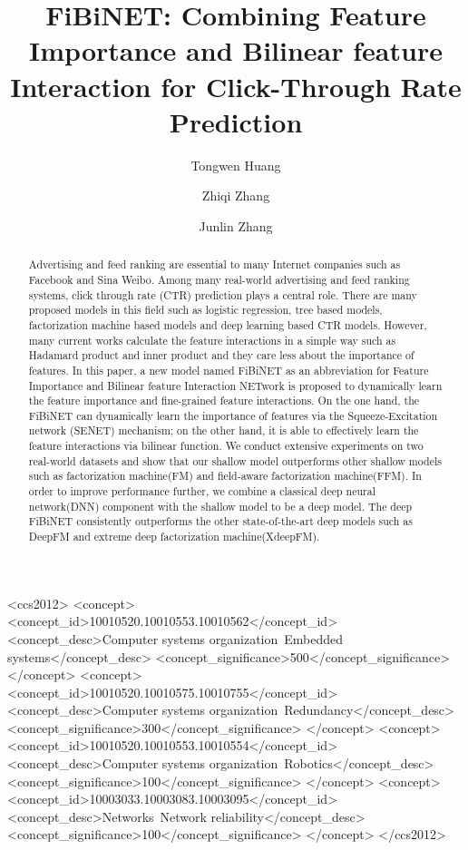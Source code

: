 \documentclass[sigconf]{acmart}
\begin{document}
\title[FiBiNET]{FiBiNET: Combining Feature Importance and Bilinear feature Interaction for Click-Through Rate Prediction}


\author{Tongwen Huang}

\author{Zhiqi Zhang}

\author{Junlin Zhang}
 

\begin{abstract}
Advertising and feed ranking are essential to many Internet companies such as Facebook and Sina Weibo. Among many real-world advertising and feed ranking systems, click through rate (CTR) prediction plays a central role. There are many proposed models in this field such as logistic regression, tree based models, factorization machine based models and deep learning based CTR models. However, many current works calculate the feature interactions in a simple way such as Hadamard product and inner product and they care less about the importance of features. In this paper, a new model named FiBiNET as an abbreviation for Feature Importance and Bilinear feature Interaction NETwork is proposed to dynamically learn the feature importance and fine-grained feature interactions. On the one hand, the FiBiNET can dynamically learn the importance of features via the Squeeze-Excitation network (SENET) mechanism; on the other hand, it is able to effectively learn the feature interactions via bilinear function. We conduct extensive experiments on two real-world datasets and show that our shallow model outperforms other shallow models such as factorization machine(FM) and field-aware factorization machine(FFM). In order to improve performance further, we combine a classical deep neural network(DNN) component with the
shallow model to be a deep model. The deep FiBiNET consistently outperforms the other state-of-the-art deep models such as DeepFM and extreme deep factorization machine(XdeepFM).
\end{abstract}

\begin{CCSXML}
<ccs2012>
 <concept>
  <concept_id>10010520.10010553.10010562</concept_id>
  <concept_desc>Computer systems organization~Embedded systems</concept_desc>
  <concept_significance>500</concept_significance>
 </concept>
 <concept>
  <concept_id>10010520.10010575.10010755</concept_id>
  <concept_desc>Computer systems organization~Redundancy</concept_desc>
  <concept_significance>300</concept_significance>
 </concept>
 <concept>
  <concept_id>10010520.10010553.10010554</concept_id>
  <concept_desc>Computer systems organization~Robotics</concept_desc>
  <concept_significance>100</concept_significance>
 </concept>
 <concept>
  <concept_id>10003033.10003083.10003095</concept_id>
  <concept_desc>Networks~Network reliability</concept_desc>
  <concept_significance>100</concept_significance>
 </concept>
</ccs2012>
\end{CCSXML}
\end{document}
